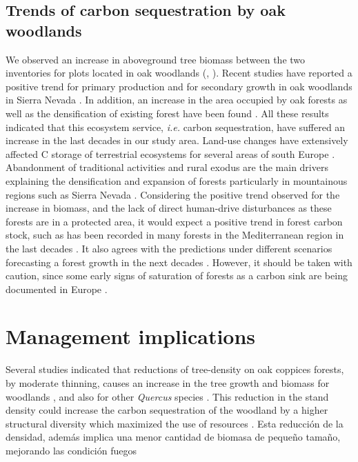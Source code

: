 \subsection{Trends of carbon sequestration by oak woodlands}\label{sec:carbon:discussion-trends}
We observed an increase in aboveground tree biomass between the two inventories for plots located in oak woodlands (, ). Recent studies have reported a positive trend for primary production and for secondary growth in oak woodlands in Sierra Nevada \autocite{AlcarazSeguraetal2016ChangesVegetation,Dionisioetal2012SatelliteBasedMonitoring,PerezLuqueetal2015OntologicalSystem,PerezLuqueetal2020LanduseLegacies}. In addition, an increase in the area occupied by oak forests \autocite{CamachoOlmedoetal2002TransformacionPaisaje} as well as the densification of existing forest have been found \autocite{JimenezOlivenciaetal2015MedioSiglo}. All these results indicated that this ecosystem service, \emph{i.e.} carbon sequestration, have suffered an increase in the last decades in our study area. Land-use changes have extensively affected C storage of terrestrial ecosystems for several areas of south Europe \autocite{MunozRojasetal2011ChangesLand,MunozRojasetal2015ImpactLand}. Abandonment of traditional activities and rural exodus are the main drivers explaining the densification and expansion of forests particularly in mountainous regions such as Sierra Nevada \autocite{JimenezOlivenciaetal2015MedioSiglo,MacDonaldetal2000AgriculturalAbandonment}. Considering the positive trend observed for the increase in biomass, and the lack of direct human-drive disturbances as these forests are in a protected area, it would expect a positive trend in forest carbon stock, such as has been recorded in many forests in the Mediterranean region in the last decades \autocite{FAOPlanBleu2018StateMediterranean}. It also agrees with the predictions under different scenarios forecasting a forest growth in the next decades \autocite{Aparicioetal2015ClimateChange}. However, it should be taken with caution, since some early signs of saturation of forests as a carbon sink are being documented in Europe \autocite{Nabuursetal2013FirstSigns}.

\section{Management implications}\label{sec:carbon:discussion-management}

Several studies indicated that reductions of tree-density on oak coppices forests, by moderate thinning, causes an increase in the tree growth and biomass for \Qp woodlands \autocite{Aldeaetal2017ThinningEnhances,Aldeaetal2017EfectoClaras,MorenoFernandezetal2020InfluenceClimate,Canellasetal2004GrowthResponse}, and also for other \emph{Quercus} species \autocites[\emph{e.g.}][]{Cotillasetal2009GrowthResponse,FernandezdeUnaetal2015StandCompetition}. This reduction in the stand density could increase the carbon sequestration of the woodland by a higher structural diversity which maximized the use of resources \autocite{CastanoSantamariaetal2013PotentialGround}. Esta reducción de la densidad, además implica una menor cantidad de biomasa de pequeño tamaño, mejorando las condición fuegos